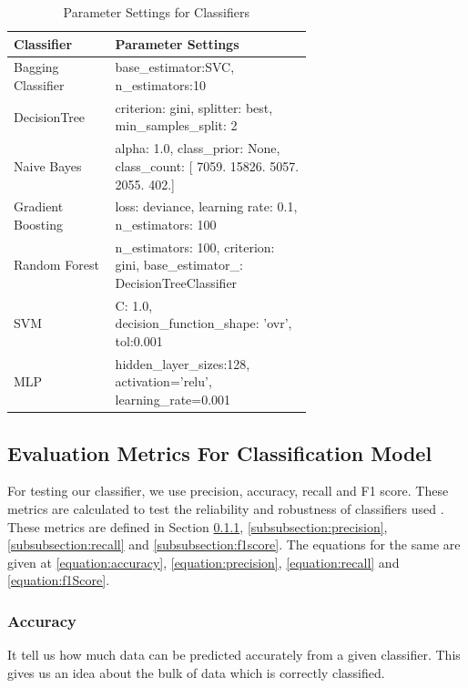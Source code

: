 \documentclass[conference]{IEEEtran}
\begin{document}
\begin{table}[h!]
    \centering
    \caption{Parameter Settings for Classifiers}
    \begin{tabular}{|m{0.20\linewidth}|m{0.45\linewidth}|}
    \hline
        \textbf{Classifier} & \textbf{Parameter Settings} \\ \hline
        Bagging Classifier & base\_estimator:SVC, n\_estimators:10 \\ \hline
        DecisionTree & criterion: gini, splitter: best, min\_samples\_split: 2 \\ \hline
        Naive Bayes & alpha: 1.0, class\_prior: None, class\_count: [ 7059. 15826.  5057.  2055.   402.] \\ \hline
        Gradient Boosting & loss: deviance, learning rate: 0.1, n\_estimators: 100 \\ \hline
        Random Forest & n\_estimators: 100, criterion: gini, base\_estimator\_: DecisionTreeClassifier \\ \hline
        SVM & C: 1.0, decision\_function\_shape: 'ovr', tol:0.001 \\ \hline
        MLP & hidden\_layer\_sizes:128, activation='relu', learning\_rate=0.001 \\ \hline
    \end{tabular}
    \label{table:parametersClassifiers}
\end{table}

\subsection{Evaluation Metrics For Classification Model}
\label{subsection:evaluationMetrics}
For testing our classifier, we use precision, accuracy, recall and F1 score. These metrics are calculated to test the reliability and robustness of classifiers used . These metrics are defined in Section \ref{subsubsection:accuracy}, \ref{subsubsection:precision}, \ref{subsubsection:recall} and  \ref{subsubsection:f1score}\cite{article:evaluationMetrics}. The equations for the same are given at \ref{equation:accuracy}, \ref{equation:precision}, \ref{equation:recall} and \ref{equation:f1Score}. 

\subsubsection{Accuracy}
\label{subsubsection:accuracy}
It tell us how much data can be predicted accurately from a given classifier. This gives us an idea about the bulk of data which is correctly classified.
\end{document}
